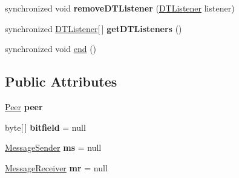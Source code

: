 \begin{DoxyCompactItemize}
\item 
\hypertarget{classj_bittorrent_a_p_i_1_1_download_task_aa24fe780201a3ffa1630fddf2140cd3a}{
synchronized void {\bfseries removeDTListener} (\hyperlink{interfacej_bittorrent_a_p_i_1_1_d_t_listener}{DTListener} listener)}
\label{classj_bittorrent_a_p_i_1_1_download_task_aa24fe780201a3ffa1630fddf2140cd3a}

\item 
\hypertarget{classj_bittorrent_a_p_i_1_1_download_task_a4da7e4900dcd4e2cbf77692917505d5f}{
synchronized \hyperlink{interfacej_bittorrent_a_p_i_1_1_d_t_listener}{DTListener}\mbox{[}$\,$\mbox{]} {\bfseries getDTListeners} ()}
\label{classj_bittorrent_a_p_i_1_1_download_task_a4da7e4900dcd4e2cbf77692917505d5f}

\item 
synchronized void \hyperlink{classj_bittorrent_a_p_i_1_1_download_task_a914822d063b324e3a1fc8361d9ed67fa}{end} ()
\end{DoxyCompactItemize}
\subsection*{Public Attributes}
\begin{DoxyCompactItemize}
\item 
\hypertarget{classj_bittorrent_a_p_i_1_1_download_task_abaf8029aaa0b7cbd04294dc1bfa35c75}{
\hyperlink{classj_bittorrent_a_p_i_1_1_peer}{Peer} {\bfseries peer}}
\label{classj_bittorrent_a_p_i_1_1_download_task_abaf8029aaa0b7cbd04294dc1bfa35c75}

\item 
\hypertarget{classj_bittorrent_a_p_i_1_1_download_task_a14e248880e79473017ae0809606af8d3}{
byte\mbox{[}$\,$\mbox{]} {\bfseries bitfield} = null}
\label{classj_bittorrent_a_p_i_1_1_download_task_a14e248880e79473017ae0809606af8d3}

\item 
\hypertarget{classj_bittorrent_a_p_i_1_1_download_task_a2f868a347dd0423436e2da56704beb05}{
\hyperlink{classj_bittorrent_a_p_i_1_1_message_sender}{MessageSender} {\bfseries ms} = null}
\label{classj_bittorrent_a_p_i_1_1_download_task_a2f868a347dd0423436e2da56704beb05}

\item 
\hypertarget{classj_bittorrent_a_p_i_1_1_download_task_a9da1472bdfa21a1b6590b34fc1e1cb71}{
\hyperlink{classj_bittorrent_a_p_i_1_1_message_receiver}{MessageReceiver} {\bfseries mr} = null}
\label{classj_bittorrent_a_p_i_1_1_download_task_a9da1472bdfa21a1b6590b34fc1e1cb71}

\end{DoxyCompactItemize}
